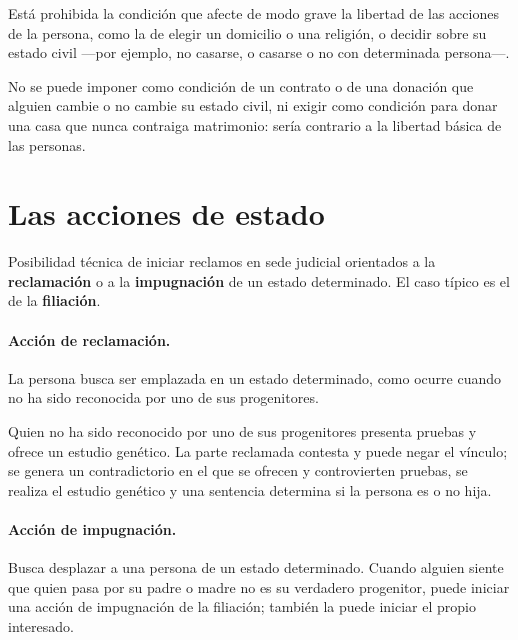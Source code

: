 \documentclass[12pt,oneside]{book}
\begin{document}
\begin{regla}
Está prohibida la condición que afecte de modo grave la libertad de las acciones de la persona, como la de elegir un domicilio o una religión, o decidir sobre su estado civil ---por ejemplo, no casarse, o casarse o no con determinada persona---.
\end{regla}

No se puede imponer como condición de un contrato o de una donación que alguien cambie o no cambie su estado civil, ni exigir como condición para donar una casa que nunca contraiga matrimonio: sería contrario a la libertad básica de las personas.

\section{Las acciones de estado}

\begin{definicion}
Posibilidad técnica de iniciar reclamos en sede judicial orientados a la \textbf{reclamación} o a la \textbf{impugnación} de un estado determinado. El caso típico es el de la \textbf{filiación}.
\end{definicion}

\paragraph{Acción de reclamación.} La persona busca ser emplazada en un estado determinado, como ocurre cuando no ha sido reconocida por uno de sus progenitores.

\begin{ejemplo}
Quien no ha sido reconocido por uno de sus progenitores presenta pruebas y ofrece un estudio genético. La parte reclamada contesta y puede negar el vínculo; se genera un contradictorio en el que se ofrecen y controvierten pruebas, se realiza el estudio genético y una sentencia determina si la persona es o no hija.
\end{ejemplo}

\paragraph{Acción de impugnación.} Busca desplazar a una persona de un estado determinado. Cuando alguien siente que quien pasa por su padre o madre no es su verdadero progenitor, puede iniciar una acción de impugnación de la filiación; también la puede iniciar el propio interesado.
\end{document}
